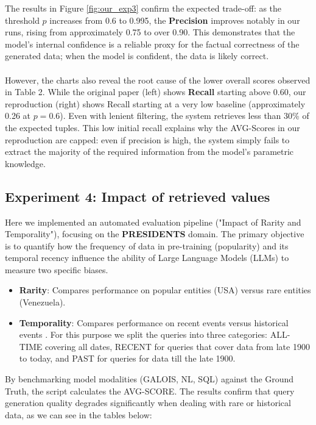 The results in Figure \ref{fig:our_exp3} confirm the expected trade-off: as the threshold $p$ increases from 0.6 to 0.995, the \textbf{Precision} improves notably in our runs, rising from approximately 0.75 to over 0.90. This demonstrates that the model's internal confidence is a reliable proxy for the factual correctness of the generated data; when the model is confident, the data is likely correct.
\\\\
However, the charts also reveal the root cause of the lower overall scores observed in Table 2. While the original paper (left) shows \textbf{Recall} starting above 0.60, our reproduction (right) shows Recall starting at a very low baseline (approximately 0.26 at $p=0.6$). Even with lenient filtering, the system retrieves less than 30\% of the expected tuples. This low initial recall explains why the AVG-Scores in our reproduction are capped: even if precision is high, the system simply fails to extract the majority of the required information from the model's parametric knowledge.


\subsection{Experiment 4: Impact of retrieved values}

Here we implemented an automated evaluation pipeline  ("Impact of Rarity and Temporality"), focusing on the \textbf{PRESIDENTS} domain. The primary objective is to quantify how the frequency of data in pre-training (popularity) and its temporal recency influence the ability of Large Language Models (LLMs)  to measure two specific biases.
\begin{itemize}
    \item \textbf{Rarity}: Compares performance on popular entities (USA) versus rare entities (Venezuela).
    \item \textbf{Temporality}: Compares performance on recent events versus historical events . For this purpose we split the queries into three categories: ALL-TIME covering all dates, RECENT for queries that cover data from late 1900 to today, and PAST for queries
for data till the late 1900.
\end{itemize}



By benchmarking model modalities (GALOIS, NL, SQL) against the Ground Truth, the script calculates the AVG-SCORE. The results confirm that query generation quality degrades significantly when dealing with rare or historical data, as we can see in the tables below:

